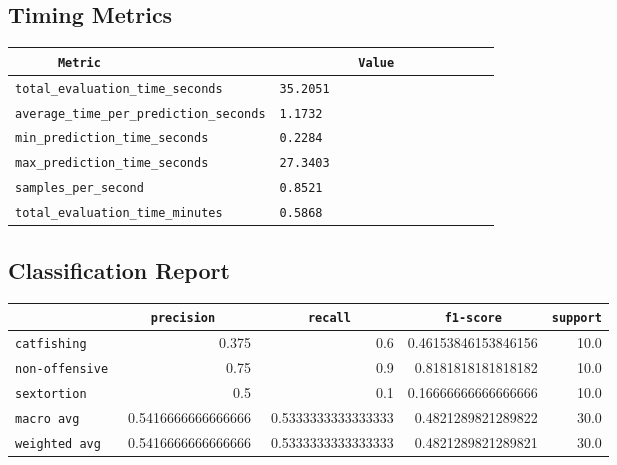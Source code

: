 \documentclass{article}
\begin{document}
\subsection{Timing Metrics}

\begin{center}
\begin{tabular}{l | l} \hline
    \verb|      Metric     | & \verb|           Value           | \\ \hline
    \hline
    \verb|total_evaluation_time_seconds| & \verb|35.2051                      | \\ \hline
    \verb|average_time_per_prediction_seconds| & \verb|1.1732                       | \\ \hline
    \verb|min_prediction_time_seconds| & \verb|0.2284                       | \\ \hline
    \verb|max_prediction_time_seconds| & \verb|27.3403                      | \\ \hline
    \verb|samples_per_second| & \verb|0.8521                       | \\ \hline
    \verb|total_evaluation_time_minutes| & \verb|0.5868                       | \\ \hline
\end{tabular}
\end{center}

\subsection{Classification Report}

\begin{center}
\begin{tabular}{l | r | r | r | r} \hline
    \verb|            | & \verb|    precision     | & \verb|      recall      | & \verb|     f1-score     | & \verb|support| \\ \hline
    \hline
    \verb|catfishing | & 0.375 & 0.6 & 0.46153846153846156 &    10.0 \\ \hline
    \verb|non-offensive| & 0.75 & 0.9 & 0.8181818181818182 &    10.0 \\ \hline
    \verb|sextortion | & 0.5 & 0.1 & 0.16666666666666666 &    10.0 \\ \hline
    \verb|macro avg  | & 0.5416666666666666 & 0.5333333333333333 & 0.4821289821289822 &    30.0 \\ \hline
    \verb|weighted avg| & 0.5416666666666666 & 0.5333333333333333 & 0.4821289821289821 &    30.0 \\ \hline
\end{tabular}
\end{center}
\end{document}
